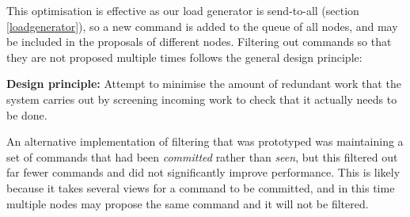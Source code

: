 This optimisation is effective as our load generator is send-to-all (section \ref{loadgenerator}), so a new command is added to the queue of all nodes, and may be included in the proposals of different nodes. Filtering out commands so that they are not proposed multiple times follows the general design principle:

\textbf{Design principle: } Attempt to minimise the amount of redundant work that the system carries out by screening incoming work to check that it actually needs to be done.

An alternative implementation of filtering that was prototyped was maintaining a set of commands that had been \textit{committed} rather than \textit{seen}, but this filtered out far fewer commands and did not significantly improve performance. This is likely because it takes several views for a command to be committed, and in this time multiple nodes may propose the same command and it will not be filtered.





